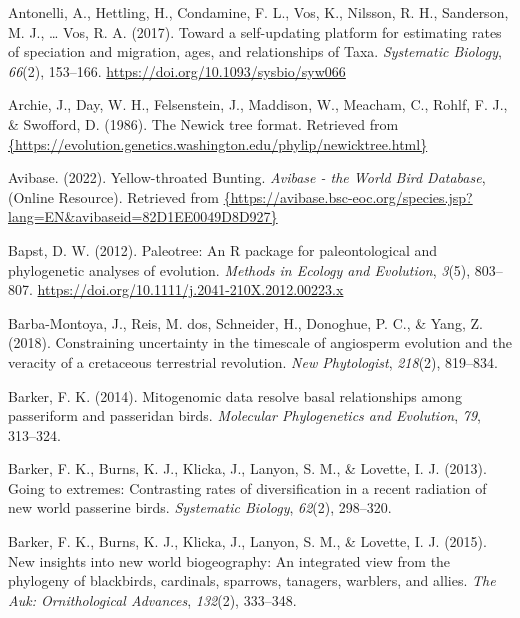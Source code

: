 \documentclass[english,man]{apa6}
\begin{document}
\leavevmode\hypertarget{ref-antonelli2017supersmart}{}%
Antonelli, A., Hettling, H., Condamine, F. L., Vos, K., Nilsson, R. H., Sanderson, M. J., \ldots{} Vos, R. A. (2017). Toward a self-updating platform for estimating rates of speciation and migration, ages, and relationships of Taxa. \emph{Systematic Biology}, \emph{66}(2), 153--166. \url{https://doi.org/10.1093/sysbio/syw066}

\leavevmode\hypertarget{ref-archie1986newick}{}%
Archie, J., Day, W. H., Felsenstein, J., Maddison, W., Meacham, C., Rohlf, F. J., \& Swofford, D. (1986). The Newick tree format. Retrieved from \href{\%7Bhttps://evolution.genetics.washington.edu/phylip/newicktree.html\%7D}{\{https://evolution.genetics.washington.edu/phylip/newicktree.html\}}

\leavevmode\hypertarget{ref-avibase-emberiza}{}%
Avibase. (2022). Yellow-throated Bunting. \emph{Avibase - the World Bird Database}, (Online Resource). Retrieved from \href{\%7Bhttps://avibase.bsc-eoc.org/species.jsp?lang=EN\&avibaseid=82D1EE0049D8D927\%7D}{\{https://avibase.bsc-eoc.org/species.jsp?lang=EN\&avibaseid=82D1EE0049D8D927\}}

\leavevmode\hypertarget{ref-Bapst2012a}{}%
Bapst, D. W. (2012). Paleotree: An R package for paleontological and phylogenetic analyses of evolution. \emph{Methods in Ecology and Evolution}, \emph{3}(5), 803--807. \url{https://doi.org/10.1111/j.2041-210X.2012.00223.x}

\leavevmode\hypertarget{ref-barba2018constraining}{}%
Barba-Montoya, J., Reis, M. dos, Schneider, H., Donoghue, P. C., \& Yang, Z. (2018). Constraining uncertainty in the timescale of angiosperm evolution and the veracity of a cretaceous terrestrial revolution. \emph{New Phytologist}, \emph{218}(2), 819--834.

\leavevmode\hypertarget{ref-barker2014mitogenomic}{}%
Barker, F. K. (2014). Mitogenomic data resolve basal relationships among passeriform and passeridan birds. \emph{Molecular Phylogenetics and Evolution}, \emph{79}, 313--324.

\leavevmode\hypertarget{ref-barker2013going}{}%
Barker, F. K., Burns, K. J., Klicka, J., Lanyon, S. M., \& Lovette, I. J. (2013). Going to extremes: Contrasting rates of diversification in a recent radiation of new world passerine birds. \emph{Systematic Biology}, \emph{62}(2), 298--320.

\leavevmode\hypertarget{ref-barker2015new}{}%
Barker, F. K., Burns, K. J., Klicka, J., Lanyon, S. M., \& Lovette, I. J. (2015). New insights into new world biogeography: An integrated view from the phylogeny of blackbirds, cardinals, sparrows, tanagers, warblers, and allies. \emph{The Auk: Ornithological Advances}, \emph{132}(2), 333--348.
\end{document}
